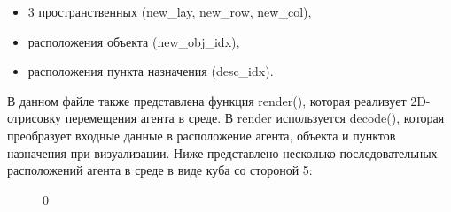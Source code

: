 \documentclass[a4paper]{report}
\theoremstyle{definition}
\theoremstyle{plain}
\theoremstyle{remark}
\theoremstyle{remark}
\theoremstyle{definition}
\begin{document}
\begin{itemize}
    \item 3 пространственных (new\_lay, new\_row, new\_col),
    \item расположения объекта (new\_obj\_idx),
    \item расположения пункта назначения (desc\_idx).
\end{itemize}
В данном файле также представлена функция render(), которая реализует 2D-отрисовку перемещения агента в среде. В render используется decode(), которая преобразует входные данные в расположение агента, объекта и пунктов назначения при визуализации. Ниже представлено несколько последовательных расположений агента в среде в виде куба со стороной 5:
\begin{figure}[H]
    \begin{minipage}[H]{0.24\linewidth}
         0\\
    \end{minipage}
    \begin{minipage}[H]{0.24\linewidth}

\end{minipage}
\end{figure}
\end{document}
